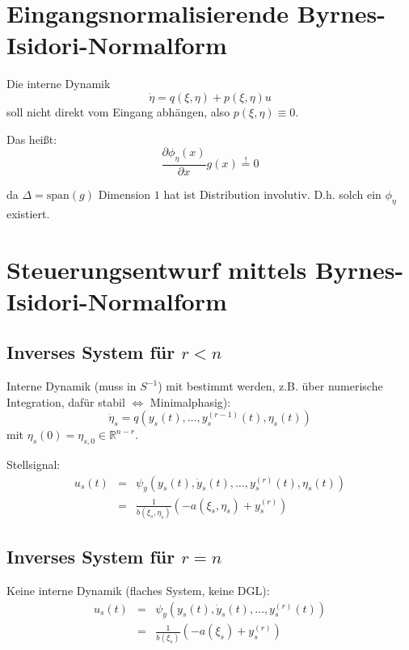 \section{Eingangsnormalisierende Byrnes-Isidori-Normalform}
Die interne Dynamik
\begin{equation}
    \dot{\eta} = q(\xi, \eta) + p(\xi, \eta) u
\end{equation}
soll nicht direkt vom Eingang abhängen, also $p(\xi, \eta) \equiv 0$.

Das heißt:
\begin{equation}
    \frac{\partial \phi_\eta(x)}{\partial x}g(x) \stackrel{!}{=} 0
\end{equation}

da $\Delta = \text{span}(g)$ Dimension $1$ hat ist Distribution involutiv. D.h. solch
ein $\phi_\eta$ existiert.

\section{Steuerungsentwurf mittels Byrnes-Isidori-Normalform}
\subsection{Inverses System für $r<n$}
Interne Dynamik (muss in $S^{-1}$) mit bestimmt werden, z.B. über numerische Integration,
dafür stabil $\Leftrightarrow$ Minimalphasig):
\begin{equation}
    \dot{\eta}_s = q(y_s(t), \ldots, y_s^{(r-1)}(t), \eta_s(t))
\end{equation}
mit $\eta_s(0) = \eta_{s,0} \in \mathbb{R}^{n-r}$.

Stellsignal:
\begin{eqnarray}
    u_s(t) &=& \psi_y(y_s(t), \dot{y}_s(t), \ldots, y_s^{(r)}(t), \eta_s(t)) \\
        &=& \frac{1}{b(\xi_s, \eta_s)} (-a(\xi_s, \eta_s) + y_s^{(r)})
\end{eqnarray}

\subsection{Inverses System für $r=n$}
Keine interne Dynamik (flaches System, keine DGL):
\begin{eqnarray}
    u_s(t) &=& \psi_y(y_s(t), \dot{y}_s(t), \ldots, y_s^{(r)}(t)) \\
        &=& \frac{1}{b(\xi_s)} (-a(\xi_s) + y_s^{(r)})
\end{eqnarray}

